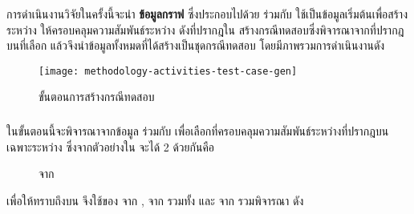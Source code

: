 การดำเนินงานวิจัยในครั้งนี้จะนำ {\bf ข้อมูลกราฟ} ซึ่งประกอบไปด้วย {\it {\scg}} ร่วมกับ{\it {\cfg}} ใช้เป็นข้อมูลเริ่มต้นเพื่อสร้าง{\TestPath}
ระหว่าง{\CUT} ให้ครอบคลุมความสัมพันธ์ระหว่าง{\class} ดังที่ปรากฎใน{\scg} 
สร้างกรณีทดสอบซึ่งพิจารณาจาก{\PredicateNode}ที่ปรากฎบน{\TestPath}ที่เลือก แล้วจึงนำข้อมูลทั้งหมดที่ได้สร้างเป็นชุดกรณีทดสอบ 
โดยมีภาพรวมการดำเนินงานดัง 

\begin{figure}[ht!]
    \centering
    \texttt{[image: methodology-activities-test-case-gen]}
    \caption{ขั้นตอนการสร้างกรณีทดสอบ}
    \label{fig:testcaseGenerationActivity}
\end{figure}

\subsubsection{\testpathSelection}

ในขั้นตอนนี้จะพิจารณาจากข้อมูล{\it \scg} ร่วมกับ {\it \cfg} เพื่อเลือก{\TestPath}ที่ครอบคลุมความสัมพันธ์ระหว่าง{\class}ที่ปรากฎบน{\scg} 
เฉพาะระหว่าง{\CUT} ซึ่งจาก{\scg}ตัวอย่างใน จะได้{\TestPath} 2 {\Path} ด้วยกันคือ

\begin{figure}[ht!]
    \centering
    \caption{{\TestPath}จาก{\scg}}
    \label{fig:testPathFromSCG}
\end{figure}

เพื่อให้ทราบถึง{\pathConditions}บน{\TestPath} จึงใช้{\cfg}ของ{\method}  จาก{\class} , 
{\method}  จาก{\class}  รวมทั้ง{\method}  และ  จาก{\class} 
รวมพิจารณา ดัง

